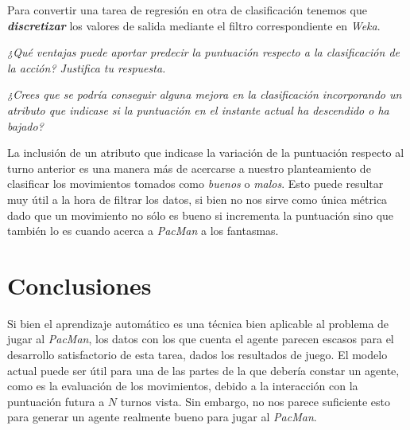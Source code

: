 \documentclass[12pt]{article}
\begin{document}
Para convertir una tarea de regresión en otra de clasificación tenemos que \textbf{\emph{discretizar}} los valores de salida mediante el filtro correspondiente en \emph{Weka}.

\begin{center}
    \vspace{0.3cm} \emph{¿Qué ventajas puede aportar predecir la puntuación respecto a la clasificación de la acción? Justifica tu respuesta.}
    \vspace{0.3cm}
\end{center}


\newpage
\begin{center}
    \vspace{0.3cm} \emph{¿Crees que se podría conseguir alguna mejora en la clasificación incorporando un atributo que indicase si la puntuación en el instante actual ha descendido o ha bajado?}
    \vspace{0.3cm}
\end{center}

La inclusión de un atributo que indicase la variación de la puntuación respecto al turno anterior es una manera más de acercarse a nuestro planteamiento de clasificar los movimientos tomados como \emph{buenos} o \emph{malos}. Esto puede resultar muy útil a la hora de filtrar los datos, si bien no nos sirve como única métrica dado que un movimiento no sólo es bueno si incrementa la puntuación sino que también lo es cuando acerca a \emph{PacMan} a los fantasmas.

\section{Conclusiones}

Si bien el aprendizaje automático es una técnica bien aplicable al problema de jugar al \emph{PacMan}, los datos con los que cuenta el agente parecen escasos para el desarrollo satisfactorio de esta tarea, dados los resultados de juego. El modelo actual puede ser útil para una de las partes de la que debería constar un agente, como es la evaluación de los movimientos, debido a la interacción con la puntuación futura a $N$ turnos vista. Sin embargo, no nos parece suficiente esto para generar un agente realmente bueno para jugar al \emph{PacMan}.
\end{document}
